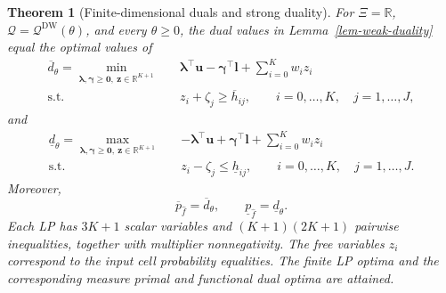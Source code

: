 \documentclass[review,11pt,3p,authoryear,nopreprintline]{elsarticle}
\newtheorem{theorem}{Theorem}
\begin{document}
\begin{theorem}[Finite-dimensional duals and strong duality]
  \label{thm-finite-dual-reformulations}
  For $\Xi=\mathbb R$, $\mathcal Q=\mathcal Q^{\mathrm{DW}}(\theta)$, and every $\theta\ge0$, the dual values in Lemma~\ref{lem-weak-duality} equal the optimal values of
  \begin{equation}
    \begin{aligned}
      \overline d_\theta
      =\min_{\bm\lambda,\bm\gamma\ge\bm 0,\ \bm z\in\mathbb R^{K+1}}\quad&
        \bm\lambda^\top\bm u-\bm\gamma^\top\bm l+\sum_{i=0}^K w_i z_i\\
      \text{s.t.}\quad&
        z_i+\zeta_j\ge\overline h_{ij},
        \qquad i=0,\ldots,K,\quad j=1,\ldots,J,
    \end{aligned}
    \label{eq-finite-upper-dual}
  \end{equation}
  and
  \begin{equation}
    \begin{aligned}
      \underline d_\theta
      =\max_{\bm\lambda,\bm\gamma\ge\bm 0,\ \bm z\in\mathbb R^{K+1}}\quad&
        -\bm\lambda^\top\bm u+\bm\gamma^\top\bm l+\sum_{i=0}^K w_i z_i\\
      \text{s.t.}\quad&
        z_i-\zeta_j\le\underline h_{ij},
        \qquad i=0,\ldots,K,\quad j=1,\ldots,J.
    \end{aligned}
    \label{eq-finite-lower-dual}
  \end{equation}
  Moreover,
  \begin{equation}
    \overline p_{\hat f}=\overline d_\theta,\qquad
    \underline p_{\hat f}=\underline d_\theta.
    \label{eq-strong-duality}
  \end{equation}
  Each LP has $3K+1$ scalar variables and $(K+1)(2K+1)$ pairwise inequalities, together with multiplier nonnegativity. The free variables $z_i$ correspond to the input cell probability equalities. The finite LP optima and the corresponding measure primal and functional dual optima are attained.
\end{theorem}
\end{document}
